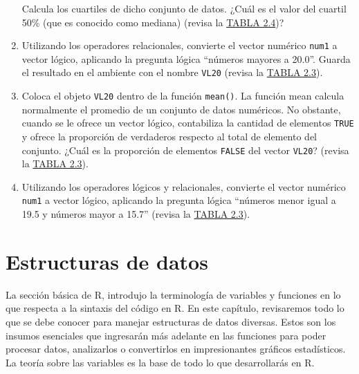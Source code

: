 \documentclass[
]{article}
\theoremstyle{definition}
\theoremstyle{definition}
\theoremstyle{definition}
\theoremstyle{definition}
\theoremstyle{remark}
\begin{document}
\begin{enumerate}
  Calcula los cuartiles de dicho conjunto de datos. ¿Cuál es el valor del cuartil 50\% (que es conocido como mediana) (revisa la \protect\hyperlink{funciones-buxe1sica-uxfatiles}{TABLA 2.4})?
\item
  Utilizando los operadores relacionales, convierte el vector numérico \texttt{num1} a vector lógico, aplicando la pregunta lógica ``números mayores a 20.0''. Guarda el resultado en el ambiente con el nombre \texttt{VL20} (revisa la \protect\hyperlink{operadores-luxf3gicos-y-relacionales}{TABLA 2.3}).
\item
  Coloca el objeto \texttt{VL20} dentro de la función \texttt{mean()}. La función mean calcula normalmente el promedio de un conjunto de datos numéricos. No obstante, cuando se le ofrece un vector lógico, contabiliza la cantidad de elementos \texttt{TRUE} y ofrece la proporción de verdaderos respecto al total de elemento del conjunto. ¿Cuál es la proporción de elementos \texttt{FALSE} del vector \texttt{VL20}? (revisa la \protect\hyperlink{operadores-luxf3gicos-y-relacionales}{TABLA 2.3}).
\item
  Utilizando los operadores lógicos y relacionales, convierte el vector numérico \texttt{num1} a vector lógico, aplicando la pregunta lógica ``números menor igual a 19.5 y números mayor a 15.7'' (revisa la \protect\hyperlink{operadores-luxf3gicos-y-relacionales}{TABLA 2.3}).
\end{enumerate}

\hypertarget{estructurasdatos}{%
\section{\texorpdfstring{\textbf{Estructuras de datos}}{Estructuras de datos}}\label{estructurasdatos}}

La sección básica de R, introdujo la terminología de variables y funciones en lo que respecta a la sintaxis del código en R. En este capítulo, revisaremos todo lo que se debe conocer para manejar estructuras de datos diversas. Estos son los insumos esenciales que ingresarán más adelante en las funciones para poder procesar datos, analizarlos o convertirlos en impresionantes gráficos estadísticos. La teoría sobre las variables es la base de todo lo que desarrollarás en R.
\end{document}
